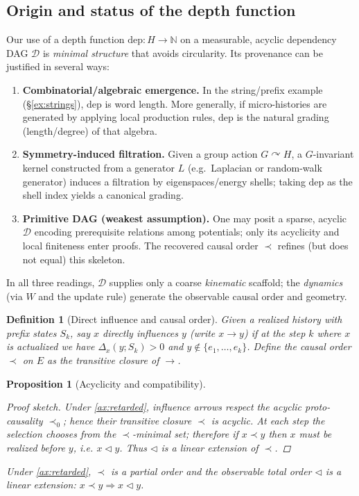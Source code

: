 \documentclass[12pt,a4paper]{article}
\newtheorem{definition}{Definition}
\newtheorem{proposition}{Proposition}
\begin{document}
\subsection{Origin and status of the depth function}\label{subsec:depth_origin}
Our use of a depth function $\mathrm{dep}:H\to\mathbb{N}$ on a measurable, acyclic dependency DAG $\mathcal{D}$ is \emph{minimal structure} that avoids circularity. Its provenance can be justified in several ways:
\begin{enumerate}
\item \textbf{Combinatorial/algebraic emergence.} In the string/prefix example (\S\ref{ex:strings}), $\mathrm{dep}$ is word length. More generally, if micro-histories are generated by applying local production rules, $\mathrm{dep}$ is the natural grading (length/degree) of that algebra.
\item \textbf{Symmetry-induced filtration.} Given a group action $G\curvearrowright H$, a $G$-invariant kernel constructed from a generator $L$ (e.g.\ Laplacian or random-walk generator) induces a filtration by eigenspaces/energy shells; taking $\mathrm{dep}$ as the shell index yields a canonical grading.
\item \textbf{Primitive DAG (weakest assumption).} One may posit a sparse, acyclic $\mathcal{D}$ encoding prerequisite relations among potentials; only its acyclicity and local finiteness enter proofs. The recovered causal order $\prec$ refines (but does not equal) this skeleton.
\end{enumerate}
In all three readings, $\mathcal{D}$ supplies only a coarse \emph{kinematic} scaffold; the \emph{dynamics} (via $W$ and the update rule) generate the observable causal order and geometry.

\begin{definition}[Direct influence and causal order]\label{def:causal}
Given a realized history with prefix states $S_k$, say $x$ \emph{directly influences} $y$ (write $x\to y$) if at the step $k$ where $x$ is actualized we have $\Delta_x(y;S_k)>0$ and $y\notin\{e_1,\dots,e_k\}$. Define the causal order $\prec$ on $E$ as the transitive closure of $\to$.
\end{definition}

\begin{proposition}[Acyclicity and compatibility]\label{prop:acyclic}
\begin{proof}[Proof sketch]
Under \cref{ax:retarded}, influence arrows respect the acyclic proto-causality $\prec_0$; hence their transitive closure $\prec$ is acyclic. At each step the selection chooses from the $\prec$-minimal set; therefore if $x\prec y$ then $x$ must be realized before $y$, i.e. $x\triangleleft y$. Thus $\triangleleft$ is a linear extension of $\prec$.
\end{proof}
Under \cref{ax:retarded}, $\prec$ is a partial order and the observable total order $\triangleleft$ is a linear extension:
$x\prec y \Rightarrow x\triangleleft y$.
\end{proposition}
\end{document}
